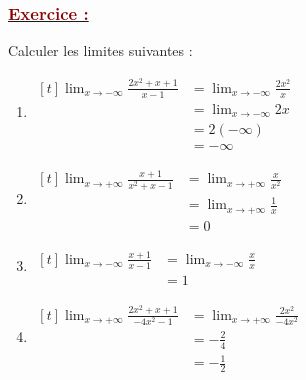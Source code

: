 \documentclass[12pt,a4paper]{article}
\begin{document}
\vspace{0.5cm}

\subsubsection*{\underline{\textcolor{darkred}{ Exercice : }}}

Calculer les limites suivantes :
\vspace{0.3cm}

\begin{enumerate}
    \item 
    $\begin{aligned}[t]
        \lim_{x \to -\infty} \frac{2x^2 + x + 1}{x - 1} &= \lim_{x \to -\infty} \frac{2x^2}{x} \\
        &= \lim_{x \to -\infty} 2x \\
        &= 2(-\infty) \\
        &= -\infty
    \end{aligned}$
    
    \vspace{0.2cm}

    \vspace{0.6cm}

    \item 
    $\begin{aligned}[t]
        \lim_{x \to +\infty} \frac{x + 1}{x^2 + x - 1} &= \lim_{x \to +\infty} \frac{x}{x^2} \\
        &= \lim_{x \to +\infty} \frac{1}{x} \\
        &= 0
    \end{aligned}$
    
    \vspace{0.2cm}

    \vspace{0.6cm}

    \item 
    $\begin{aligned}[t]
        \lim_{x \to -\infty} \frac{x + 1}{x - 1} &= \lim_{x \to -\infty} \frac{x}{x} \\
        &= 1
    \end{aligned}$
    
    \vspace{0.2cm}

    \vspace{0.6cm}

    \item 
    $\begin{aligned}[t]
        \lim_{x \to +\infty} \frac{2x^2 + x + 1}{-4x^2 - 1} &= \lim_{x \to +\infty} \frac{2x^2}{-4x^2} \\
        &= -\frac{2}{4} \\
        &= -\frac{1}{2}
    \end{aligned}$
    
    \vspace{0.2cm}
\end{enumerate}
\end{document}
